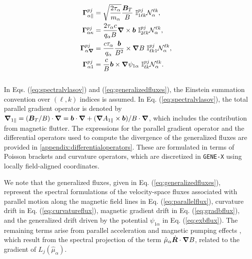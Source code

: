 \documentclass[preprint,12pt]{elsarticle}
\begin{document}
\begin{subequations} \label{eq:generalizedfluxes}
\begin{align}
    \bm \Gamma_{\alpha \parallel}^{pj} &  = \sqrt{\frac{2 \tau_\alpha}{m_\alpha}}  \frac{\bm B_{T}}{B} \ \mathbb{I}^{pj}_{1\ell k} \mathcal{N}_\alpha^{\ell k}, \label{eq:parallelflux}  \\
    \bm \Gamma_{\alpha \kappa}^{pj} & = \frac{2 \tau_\alpha  c}{q_\alpha B} \grad \times \bm b  \ \mathbb{I}^{pj }_{2\ell k} \mathcal{N}_\alpha^{\ell k}, \label{eq:curvatureflux} \\
    \bm \Gamma_{\alpha \grad}^{pj} & = \frac{c \tau_\alpha }{q_\alpha } \frac{\bm b}{B^2} \times \grad B \ \mathbb{I}^{pj}_{\ell k1} \mathcal{N}_\alpha^{\ell k}, \label{eq:gradbflux} \\
    \bm \Gamma_{\alpha 1}^{pj} & = \frac{c}{ B } \bm b \times \grad \psi_{1 \alpha}\  \mathbb{I}^{pj }_{\ell k} \mathcal{N}_\alpha^{\ell k}. \label{eq:exbflux}
\end{align}
\end{subequations}
\\
In Eqs. (\ref{eq:spectralvlasov}) and (\ref{eq:generalizedfluxes}), the Einstein summation convention over $(\ell, k)$ indices is assumed. In Eq. (\ref{eq:spectralvlasov}), the total parallel gradient operator is denoted by $\grad_{1 \parallel} = (\bm B_{T} / B) \cdot \grad = \bm b \cdot \grad + (\grad A_{1 \parallel} \times \bm b) / B \cdot \grad$, which includes the contribution from magnetic flutter. The expressions for the parallel gradient operator and the differential operators used to compute the divergence of the generalized fluxes are provided in \ref{appendix:differentialoperators}. These are formulated in terms of Poisson brackets and curvature operators, which are discretized in \verb|GENE-X| using locally field-aligned coordinates.

We note that the generalized fluxes, given in Eq. (\ref{eq:generalizedfluxes}), represent the spectral formulations of the velocity-space fluxes associated with parallel motion along the magnetic field lines in Eq. (\ref{eq:parallelflux}), curvature drift in Eq. (\ref{eq:curvatureflux}), magnetic gradient drift in Eq. (\ref{eq:gradbflux}), and the generalized drift driven by the potential $\psi_{1 \alpha}$ in Eq. (\ref{eq:exbflux}). The remaining terms arise from parallel acceleration and magnetic pumping effects \cite{scott2021}, which result from the spectral projection of the term $\hat \mu_\alpha \dot{\bm{R}} \cdot \grad B$, related to the gradient of $L_j(\hat \mu_\alpha)$.
\end{document}
